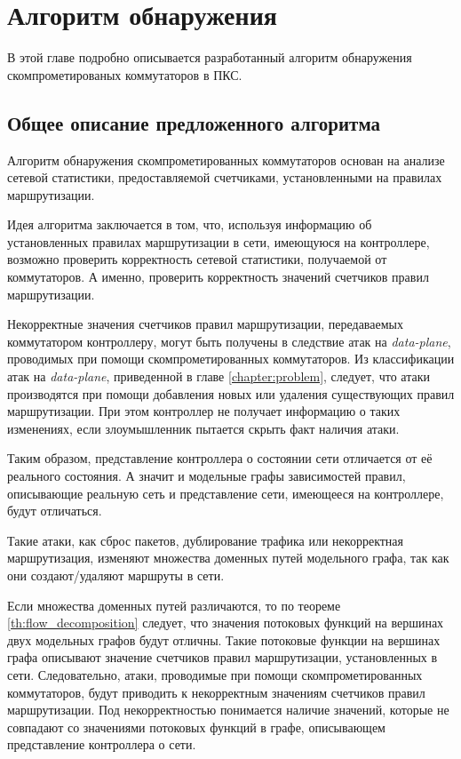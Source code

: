 \documentclass[../thesis.tex]{subfiles}
\begin{document}
\chapter{Алгоритм обнаружения} \label{chapter:algorithm}

В этой главе подробно описывается разработанный алгоритм обнаружения скомпрометированых коммутаторов в ПКС.

\section{Общее описание предложенного алгоритма}

Алгоритм обнаружения скомпрометированных коммутаторов основан на анализе сетевой статистики, предоставляемой счетчиками, установленными на правилах маршрутизации.

Идея алгоритма заключается в том, что, используя информацию об установленных правилах маршрутизации в сети, имеющуюся на контроллере, возможно проверить корректность сетевой статистики, получаемой от коммутаторов.
А именно, проверить корректность значений счетчиков правил маршрутизации.

Некорректные значения счетчиков правил маршрутизации, передаваемых коммутатором контроллеру, могут быть получены в следствие атак на \textit{data-plane}, проводимых при помощи скомпрометированных коммутаторов.
Из классификации атак на \textit{data-plane}, приведенной в главе \ref{chapter:problem}, следует, что атаки производятся при помощи добавления новых или удаления существующих правил маршрутизации.
При этом контроллер не получает информацию о таких изменениях, если злоумышленник пытается скрыть факт наличия атаки.

Таким образом, представление контроллера о состоянии сети отличается от её реального состояния.
А значит и модельные графы зависимостей правил, описывающие реальную сеть и представление сети, имеющееся на контроллере, будут отличаться.

Такие атаки, как сброс пакетов, дублирование трафика или некорректная маршрутизация, изменяют множества доменных путей модельного графа, так как они создают/удаляют маршруты в сети.

Если множества доменных путей различаются, то по теореме \ref{th:flow_decomposition} следует, что значения потоковых функций на вершинах двух модельных графов будут отличны.
Такие потоковые функции на вершинах графа описывают значение счетчиков правил маршрутизации, установленных в сети.
Следовательно, атаки, проводимые при помощи скомпрометированных коммутаторов, будут приводить к некорректным значениям счетчиков правил маршрутизации.
Под некорректностью понимается наличие значений, которые не совпадают со значениями потоковых функций в графе, описывающем представление контроллера о сети.
\end{document}
